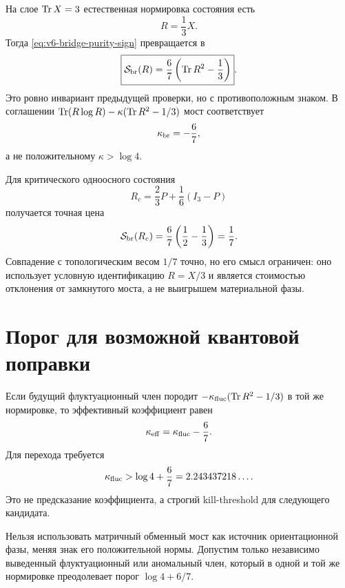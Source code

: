 На слое $\operatorname{Tr} X=3$ естественная нормировка состояния есть
\begin{equation}
 R=\frac13X.
\end{equation}
Тогда \eqref{eq:v6-bridge-purity-sign} превращается в
\begin{equation}
 \boxed{
 \mathcal S_{\rm br}(R)
 =\frac67\left(\operatorname{Tr} R^2-\frac13\right)}.
 \label{eq:v6-bridge-positive-purity}
\end{equation}
Это ровно инвариант предыдущей проверки, но с противоположным знаком.
В соглашении
$\operatorname{Tr}(R\log R)-\kappa(\operatorname{Tr} R^2-1/3)$ мост соответствует
\begin{equation}
 \kappa_{\rm br}=-\frac67,
\end{equation}
а не положительному $\kappa>\log4$.

Для критического одноосного состояния
\begin{equation}
 R_c=\frac23P+\frac16(I_3-P)
\end{equation}
получается точная цена
\begin{equation}
 \mathcal S_{\rm br}(R_c)
 =\frac67\left(\frac12-\frac13\right)
 =\frac17.
 \label{eq:v6-critical-state-bridge-cost}
\end{equation}
Совпадение с топологическим весом $1/7$ точно, но его смысл ограничен:
оно использует условную идентификацию $R=X/3$ и является стоимостью
отклонения от замкнутого моста, а не выигрышем материальной фазы.

\section{Порог для возможной квантовой поправки}

Если будущий флуктуационный член породит
$-\kappa_{\rm fluc}(\operatorname{Tr} R^2-1/3)$ в той же нормировке, то эффективный
коэффициент равен
\begin{equation}
 \kappa_{\rm eff}=\kappa_{\rm fluc}-\frac67.
\end{equation}
Для перехода требуется
\begin{equation}
 \kappa_{\rm fluc}>\log4+\frac67
 =2.243437218\ldots.
 \label{eq:v6-fluctuation-alignment-threshold}
\end{equation}
Это не предсказание коэффициента, а строгий kill-threshold для следующего
кандидата.

\begin{nogocriterion}
Нельзя использовать матричный обменный мост как источник ориентационной
фазы, меняя знак его положительной нормы. Допустим только независимо
выведенный флуктуационный или аномальный член, который в одной и той же
нормировке преодолевает порог
$\log4+6/7$.
\end{nogocriterion}

